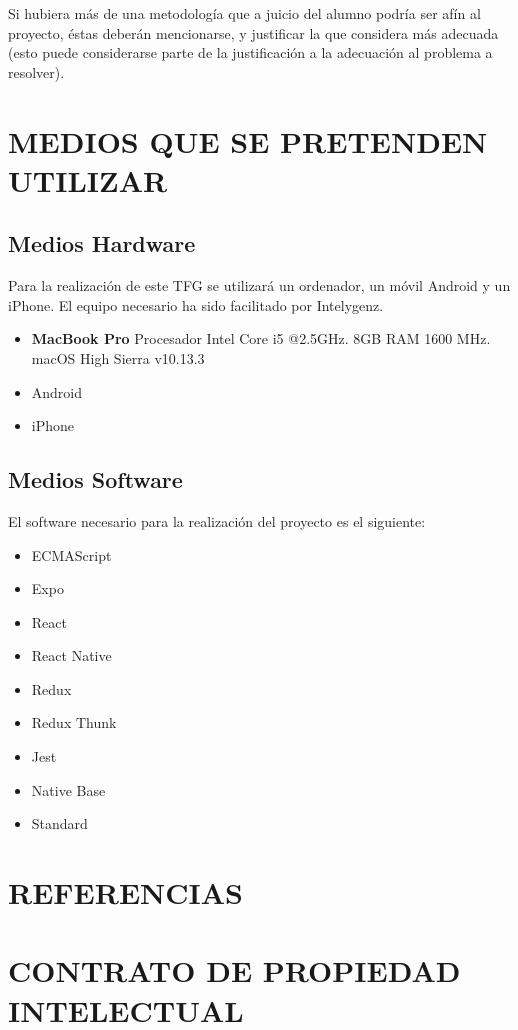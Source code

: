 \documentclass{pre-tfg}
\begin{document}
Si hubiera más de una metodología que a juicio del alumno podría ser afín al proyecto,
éstas deberán mencionarse, y justificar la que considera más adecuada (esto puede
considerarse parte de la justificación a la adecuación al problema a resolver).


\section{MEDIOS QUE SE PRETENDEN UTILIZAR}

\subsection{Medios Hardware}

Para la realización de este TFG se utilizará un ordenador, un móvil Android y un iPhone.
El equipo necesario ha sido facilitado por Intelygenz.
\begin{itemize}
  \item \textbf{MacBook Pro} Procesador Intel Core i5 @2.5GHz. 8GB RAM 1600 MHz. macOS High Sierra v10.13.3
  \item Android
  \item iPhone
\end{itemize}

\subsection{Medios Software}

El software necesario para la realización del proyecto es el siguiente:
\begin{itemize}
  \item ECMAScript~\cite{ECMA}
  \item Expo~\cite{Expo}
  \item React~\cite{REACT}
  \item React Native~\cite{RENA}
  \item Redux~\cite{REDUX}
  \item Redux Thunk~\cite{THUNK}
  \item Jest~\cite{JEST}
  \item Native Base~\cite{NABA}
  \item Standard~\cite{STAND}
\end{itemize}


\section{REFERENCIAS}


\singlespacing


\section{CONTRATO DE PROPIEDAD INTELECTUAL}
  
\end{document}
